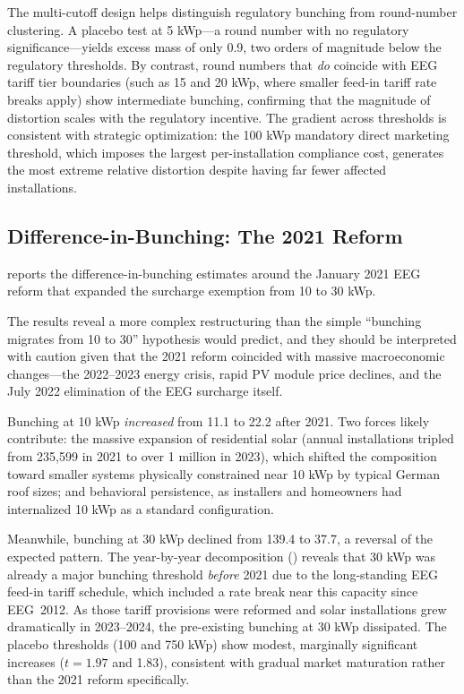 \documentclass[12pt]{article}
\begin{document}
The multi-cutoff design helps distinguish regulatory bunching from round-number clustering. A placebo test at 5 kWp---a round number with no regulatory significance---yields excess mass of only 0.9, two orders of magnitude below the regulatory thresholds. By contrast, round numbers that \textit{do} coincide with EEG tariff tier boundaries (such as 15 and 20 kWp, where smaller feed-in tariff rate breaks apply) show intermediate bunching, confirming that the magnitude of distortion scales with the regulatory incentive. The gradient across thresholds is consistent with strategic optimization: the 100 kWp mandatory direct marketing threshold, which imposes the largest per-installation compliance cost, generates the most extreme relative distortion despite having far fewer affected installations.

\subsection{Difference-in-Bunching: The 2021 Reform}

 reports the difference-in-bunching estimates around the January 2021 EEG reform that expanded the surcharge exemption from 10 to 30 kWp.



The results reveal a more complex restructuring than the simple ``bunching migrates from 10 to 30'' hypothesis would predict, and they should be interpreted with caution given that the 2021 reform coincided with massive macroeconomic changes---the 2022--2023 energy crisis, rapid PV module price declines, and the July 2022 elimination of the EEG surcharge itself.

Bunching at 10 kWp \textit{increased} from 11.1 to 22.2 after 2021. Two forces likely contribute: the massive expansion of residential solar (annual installations tripled from 235,599 in 2021 to over 1 million in 2023), which shifted the composition toward smaller systems physically constrained near 10 kWp by typical German roof sizes; and behavioral persistence, as installers and homeowners had internalized 10 kWp as a standard configuration.

Meanwhile, bunching at 30 kWp declined from 139.4 to 37.7, a reversal of the expected pattern. The year-by-year decomposition () reveals that 30 kWp was already a major bunching threshold \textit{before} 2021 due to the long-standing EEG feed-in tariff schedule, which included a rate break near this capacity since EEG~2012. As those tariff provisions were reformed and solar installations grew dramatically in 2023--2024, the pre-existing bunching at 30 kWp dissipated. The placebo thresholds (100 and 750 kWp) show modest, marginally significant increases ($t = 1.97$ and 1.83), consistent with gradual market maturation rather than the 2021 reform specifically.
\end{document}
